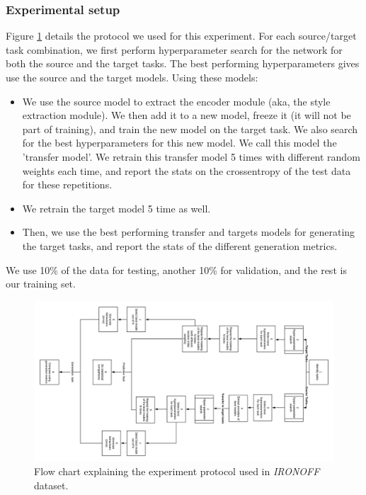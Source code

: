     \subsubsection{Experimental setup}
      \par Figure \ref{fig:ironoff_protocol} details the protocol we used for this experiment. For each source/target task combination, we first perform hyperparameter search for the network for both the source and the target tasks. The best performing hyperparameters gives use the source and the target models. Using these models:
      \begin{itemize}
        \item We use the source model to extract the encoder module (aka, the style extraction module). We then add it to a new model, freeze it (it will not be part of training), and train the new model on the target task. We also search for the best hyperparameters for this new model. We call this model the 'transfer model'. We retrain this transfer model 5 times with different random weights each time, and report the stats on the crossentropy of the test data for these repetitions.
        \item We retrain the target model 5 time as well.
        \item Then, we use the best performing transfer and targets models for generating the target tasks, and report the stats of the different generation metrics.
      \end{itemize}
      \par We use 10\% of the data for testing, another 10\% for validation, and the rest is our training set.

    \begin{figure}
      \includegraphics[scale=0.3]{images/sota/ironoff_results/IRONOFF_transfer_learning_flow.png}
      \caption[\textit{IRONOFF} experimental protocol]{Flow chart explaining the experiment protocol used in \textit{IRONOFF} dataset.}
      \label{fig:ironoff_protocol}
    \end{figure}

